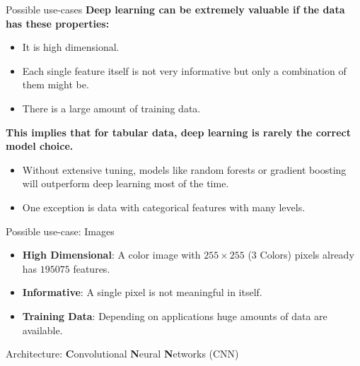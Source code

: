 \begin{frame} {Possible use-cases}
\textbf{Deep learning can be extremely valuable if the data has these properties:}
\vspace{.2cm}
\begin{itemize}
\item It is high dimensional.
\item Each single feature itself is not very informative but only a combination of them might be.
\item There is a large amount of training data.
\end{itemize}
\vspace{.7cm}
\textbf{This implies that for tabular data, deep learning is rarely the correct model choice.}
\vspace{.2cm}
\begin{itemize}
\item Without extensive tuning, models like random forests or gradient boosting will outperform deep learning most of the time.
\item One exception is data with categorical features with many levels.
\end{itemize}

\end{frame}

\begin{frame} {Possible use-case: Images}
\begin{itemize}
\item \textbf{High Dimensional}: A color image with $255 \times 255$ (3 Colors) pixels already has $195075$ features.
\vspace{.1cm}
\item \textbf{Informative}: A single pixel is not meaningful in itself.
\vspace{.1cm}
\item \textbf{Training Data}: Depending on applications huge amounts of data are available.
\end{itemize}
\vspace{.3cm}
Architecture: \textbf{C}onvolutional \textbf{N}eural \textbf{N}etworks (CNN)
\begin{figure}
\centering
{}
\end{figure}
\end{frame}

